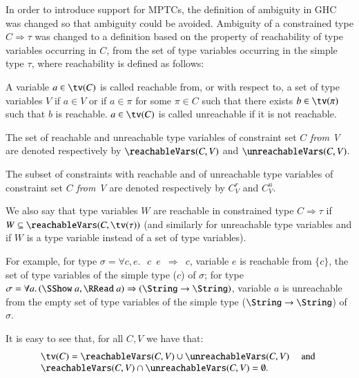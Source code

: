\documentclass[review]{elsarticle}
\begin{document}

In order to introduce support for MPTCs, the definition of ambiguity
in GHC was changed so that ambiguity could be avoided. Ambiguity of a
constrained type $C\Rightarrow \tau$ was changed to a definition based
on the property of reachability of type variables occurring in $C$,
from the set of type variables occurring in the simple type $\tau$,
where reachability is defined as follows:

\begin{Definition}

A variable $a\in \tv(C)$ is called reachable from, or with respect to,
a set of type variables $V$ if $a\in V$ or if $a\in \pi$ for some
$\pi\in C$ such that there exists $b\in \tv(\pi)$ such that $b$ is
reachable. $a\in \tv(C)$ is called unreachable if it is not
reachable.

The set of reachable and unreachable type variables of constraint set
$C$ {\em from V\/} are denoted respectively by $\reachableVars(C,V)$
and $\unreachableVars(C,V)$.

The subset of constraints with reachable and of unreachable type
variables of constraint set $C$ {\em from V\/} are denoted
respectively by $C_V^r$ and $C_V^u$.

We also say that type variables $W$ are reachable in constrained type
$C\Rightarrow \tau$ if $W\subseteq \reachableVars(C,\tv(\tau))$ (and
similarly for unreachable type variables and if $W$ is a type variable
instead of a set of type variables).

\label{Reachability}
\end{Definition}

For example, for type $\sigma= \forall c,e.\,${\tt \Coll\ $c$ $e$
  $\Rightarrow$ $c$}, variable $e$ is reachable from $\{ c\}$, the set
of type variables of the simple type ($c$) of $\sigma$; for type
$\sigma=\forall a.\,(\SShow\ a, \RRead\ a)\Rightarrow (\String
\rightarrow \String)$, variable $a$ is unreachable from the empty set
of type variables of the simple type ($\String \rightarrow \String$)
of $\sigma$.

It is easy to see that, for all $C, V$ we have that:
  \[
    \begin{array}{ll}
       \tv(C) = \reachableVars(C,V) \cup \unreachableVars(C,V) &
       \text{ and } \\
     \reachableVars(C,V) \cap \unreachableVars(C,V) = \emptyset.
   \end{array}
  \]
\end{document}
